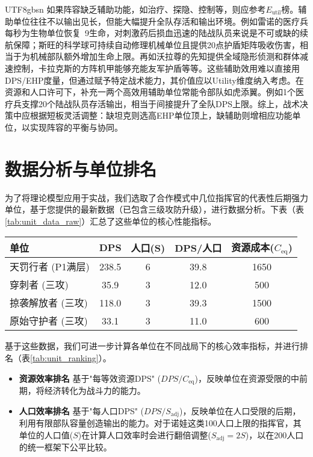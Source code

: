 \documentclass[a4paper,12pt]{article}
\begin{document}
\begin{CJK}{UTF8}{gbsn}
如果阵容缺乏辅助功能，如治疗、探隐、控制等，则应参考$E_{\text{util}}$榜。辅助单位往往不以输出见长，但能大幅提升全队存活和输出环境。例如雷诺的医疗兵每秒为生物单位恢复~9生命，对刺激药后损血迅速的陆战队员来说是不可或缺的续航保障；斯旺的科学球可持续自动修理机械单位且提供20点护盾矩阵吸收伤害，相当于为机械部队额外增加生命上限。再如沃拉尊的先知提供全域隐形侦测和群体减速控制，卡拉克斯的方阵机甲能够充能友军护盾等等。这些辅助效用难以直接用DPS/EHP度量，但通过赋予特定战术能力，其价值应以Utility维度纳入考虑。在资源和人口许可下，补充一两个高效用辅助单位常能令部队如虎添翼。例如1个医疗兵支撑20个陆战队员存活输出，相当于间接提升了全队DPS上限。综上，战术决策中应根据短板灵活调整：缺坦克则选高EHP单位顶上，缺辅助则增相应功能单位，以实现阵容的平衡与协同。

\section{数据分析与单位排名}
为了将理论模型应用于实战，我们选取了合作模式中几位指挥官的代表性后期强力单位，基于您提供的最新数据（已包含三级攻防升级），进行数据分析。下表（表\ref{tab:unit_data_raw}）汇总了这些单位的核心性能指标。

\begin{table*}[htbp]
\centering
\caption{部分后期单位核心性能数据表（三攻）}
\label{tab:unit_data_raw}
\begin{tabular}{lcccc}
\toprule
\textbf{单位} & \textbf{DPS} & \textbf{人口(S)} & \textbf{DPS/人口} & \textbf{资源成本($C_{\text{eq}}$)} \\
\midrule
天罚行者 (P1满层) & 238.5 & 6 & 39.8 & 1650 \\
穿刺者 (三攻) & 35.9 & 3 & 12.0 & 500 \\
掠袭解放者 (三攻) & 118.0 & 3 & 39.3 & 1500 \\
原始守护者 (三攻) & 33.1 & 3 & 11.0 & 600 \\
\bottomrule
\end{tabular}
\end{table*}

基于这些数据，我们可进一步计算各单位在不同战局下的核心效率指标，并进行排名（表\ref{tab:unit_ranking}）。
\begin{itemize}
    \item \textbf{资源效率排名} 基于"每等效资源DPS" ($DPS/C_{\text{eq}}$)，反映单位在资源受限的中前期，将经济转化为战斗力的能力。
    \item \textbf{人口效率排名} 基于"每人口DPS" ($DPS/S_{\text{adj}}$)，反映单位在人口受限的后期，利用有限部队容量创造输出的能力。对于诺娃这类100人口上限的指挥官，其单位的人口值($S$)在计算人口效率时会进行翻倍调整($S_{\text{adj}}=2S$)，以在200人口的统一框架下公平比较。
\end{itemize}


\end{CJK}
\end{document}
